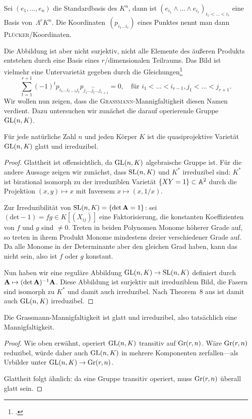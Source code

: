 Sei $(e_1, \dots, e_n)$ die Standardbasis des $K^n$, dann ist $(e_{i_1} \wedge \dots \wedge e_{i_r})_{i_1 < \dots < i_r}$ eine Basis von~$\Lambda^r K^n$. Die Koordinaten~$(p_{i_1 \dots i_r})$ eines Punktes nennt man dann \textsc{Plücker}\-/Koordinaten.

Die Abbildung ist aber nicht surjektiv, nicht alle Elemente des äußeren Produkts entstehen durch eine Basis eines $r$\-/dimensionalen Teilraums. Das Bild ist vielmehr eine Untervarietät gegeben durch die Gleichungen\footcite[siehe][S.~42]{Shafarevich}
\begin{equation} \label{eq:grcond}
\sum_{t=1}^{r+1} (-1)^t p_{i_1 \dots i_{r-1} j_t} p_{j_1 \dots \hat{j_t} \dots j_{r+1}} = 0, \quad\text{für } i_1 < \dots < i_{r-1}, j_1 < \dots < j_{r+1}.
\end{equation}
Wir wollen nun zeigen, dass die \textsc{Grassmann}-Mannigfaltigkeit diesen Namen verdient. Dazu untersuchen wir zunächst die darauf operierende Gruppe~$\mathrm{GL}(n,K)$.

\begin{lemma}
Für jede natürliche Zahl $n$ und jeden Körper $K$ ist die quasiprojektive Varietät~$\mathrm{GL}(n,K)$ glatt und irreduzibel.
\end{lemma}
\begin{proof}
Glattheit ist offensichtlich, da $\mathrm{GL}(n,K)$ algebraische Gruppe ist. Für die andere Aussage zeigen wir zunächst, dass $\mathrm{SL}(n,K)$ und $K^*$ irreduzibel sind: $K^*$ ist birational isomorph zu der irreduziblen Varietät $\{ XY = 1 \} \subset \mathbb A^{2}$ durch die Projektion $(x,y) \mapsto x$ mit Inversem $x \mapsto (x,1/x)$.

Zur Irreduzibilität von $\mathrm{SL}(n,K) = \{\det \mathbf{A} = 1\}$: sei $(\mathrm{det}-1)=fg \in K[(X_{ij})]$ eine Faktorisierung, die konstanten Koeffizienten von $f$ und $g$ sind $\neq 0$. Treten in beiden Polynomen Monome höherer Grade auf, so treten in ihrem Produkt Monome mindestens dreier verschiedener Grade auf. Da alle Monome in der Determinante aber den gleichen Grad haben, kann das nicht sein, also ist $f$ oder $g$ konstant.

Nun haben wir eine reguläre Abbildung $\mathrm{GL}(n,K) \rightarrow \mathrm{SL}(n,K)$ definiert durch $\mathbf{A} \mapsto \mathbf{(}\!\det \mathbf{A})^{-1} \mathbf{A}$. Diese Abbildung ist surjektiv mit irreduziblem Bild, die Fasern sind isomorph zu $K^*$ und damit auch irreduzibel. Nach Theorem~8 aus \cite[S.~77]{Shafarevich} ist damit auch $\mathrm{GL}(n,K)$ irreduzibel.
\end{proof}

\begin{fact} \label{fact:grassirred}
Die Grassmann-Mannigfaltigkeit ist glatt und irreduzibel, also tatsächlich eine Mannigfaltigkeit.
\end{fact}
\begin{proof}
Wie oben erwähnt, operiert $\mathrm{GL}(n,K)$ transitiv auf $\grass r/n$. Wäre $\grass r/n$ reduzibel, würde daher auch $\mathrm{GL}(n,K)$ in mehrere Komponenten zerfallen---als Urbilder unter $\GL nK \to \grass r/n$.

Glattheit folgt ähnlich: da eine Gruppe transitiv operiert, muss $\grass r/n$ überall glatt sein.
\end{proof}

